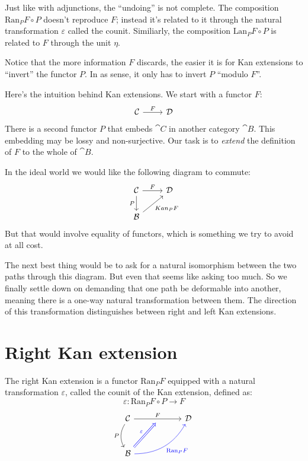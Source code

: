 \documentclass[DaoFP]{subfiles}
\begin{document}
Just like with adjunctions, the ``undoing'' is not complete. The composition $\text{Ran}_P F \circ P$ doesn't reproduce $F$; instead it's related to it through the natural transformation $\varepsilon$ called the counit. Similiarly, the composition $\text{Lan}_P F \circ P$ is related to $F$ through the unit $\eta$.

Notice that the more information $F$ discards, the easier it is for Kan extensions to ``invert'' the functor $P$. In as sense, it only has to invert $P$ ``modulo $F$''.

Here's the intuition behind Kan extensions. We start with a functor $F$:
\[
 \begin{tikzcd} \cat C
 \arrow[r, "F"]
 & \cat D
  \end{tikzcd}
\]
There is a second functor $P$ that embeds $\cat C$ in another category $\cat B$. This embedding may be lossy and non-surjective. Our task is to \emph{extend} the definition of $F$ to the whole of $\cat B$. 

In the ideal world we would like the following diagram to commute:
\[
 \begin{tikzcd} \cat C
 \arrow[r, "F"]
 \arrow[d, "P"']
 & \cat D
 \\
 \cat B
\arrow[ur, "Kan_P F"']
  \end{tikzcd}
\]
But that would involve equality of functors, which is something we try to avoid at all cost. 

The next best thing would be to ask for a natural isomorphism between the two paths through this diagram. But even that seems like asking too much. So we finally settle down on demanding that one path be deformable into another, meaning there is a one-way natural transformation between them. The direction of this transformation distinguishes between right and left Kan extensions.

\section{Right Kan extension}

The right Kan extension is a functor $\text{Ran}_P F$ equipped with a natural transformation $\varepsilon$, called the counit of the Kan extension, defined as:
\[ \varepsilon \colon \text{Ran}_P F \circ P \to F\]
\[
 \begin{tikzcd} [row sep=1cm, column sep=1cm]
 \cat C
 \arrow[rr, "F", "" {name=ID, below} ]
 \arrow[d, bend right, "P"']
 && \cat D
 \\
 \cat B
  \arrow[urr, blue, bend right, "\text{Ran}_P F"']
 \arrow[Rightarrow, blue, "\varepsilon",  to=ID]
 \end{tikzcd}
\]
\end{document}
